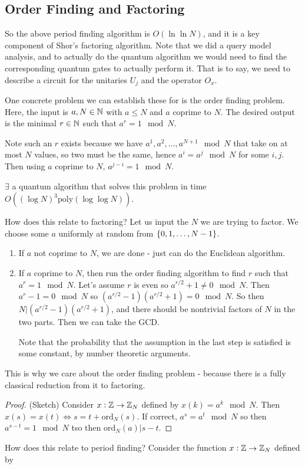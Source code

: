 \subsection*{Order Finding and Factoring}
So the above period finding algorithm is $O(\ln\ln  N)$, and it is a key component of Shor's factoring algorithm. Note that we did a query model analysis, and to actually do the quantum algorithm we would need to find the corresponding quantum gates to actually perform it. That is to say, we need to describe a circuit for the unitaries $U_j$ and the operator $O_x$. 

One concrete problem we can establish these for is the order finding problem. Here, the input is $a, N \in \mathbb{N}$ with $a \leq N$ and $a$ coprime to $N$. The desired output is the minimal $r \in \mathbb{N}$ such that $a^r = 1 \mod N$. 

Note such an $r$ exists because we have $a^1, a^2, \ldots, a^{N+1}\mod N$ that take on at most $N$ values, so two must be the same, hence $a^i = a^j \mod N$ for some $i, j$. Then using $a$ coprime to $N$, $a^{j - i} = 1 \mod N$. 

\begin{propbox}{}
    $\exists$ a quantum algorithm that solves this problem in time $O((\log N)^3 \text{poly}(\log\log N))$.
\end{propbox}

How does this relate to factoring? Let us input the $N$ we are trying to factor. We choose some $a$ uniformly at random from $\set{0, 1, \ldots, N-1}$.
\begin{enumerate}
    \item If $a$ not coprime to $N$, we are done - just can do the Euclidean algorithm.
    \item If $a$ coprime to $N$, then run the order finding algorithm to find $r$ such that $a^r = 1 \mod N$. Let's assume $r$ is even so $a^{r/2} + 1 \neq 0 \mod N$. Then $a^r-1 = 0 \mod N$ so $(a^{r/2} - 1)(a^{r/2} + 1) = 0 \mod N$. So then $N \vert(a^{r/2} - 1)(a^{r/2} + 1)$, and there should be nontrivial factors of $N$ in the two parts. Then we can take the GCD. 

    Note that the probability that the assumption in the last step is satisfied is some constant, by number theoretic arguments.
\end{enumerate}

This is why we care about the order finding problem - because there is a fully classical reduction from it to factoring.

\begin{proof}
    (Sketch) Consider $x: \mathbb{Z} \to \mathbb{Z}_N$ defined by $x(k) = a^k \mod N$. Then $x(s) = x(t) \iff s = t + \text{ord}_N(s)$. If correct, $a^s = a^t \mod N$ so then $a^{s-t} = 1 \mod N$ tso then $\text{ord}_N(a) \vert s -t$.  
\end{proof}
How does this relate to period finding? Consider the function $x: \mathbb{Z} \to \mathbb{Z}_N$ defined by 